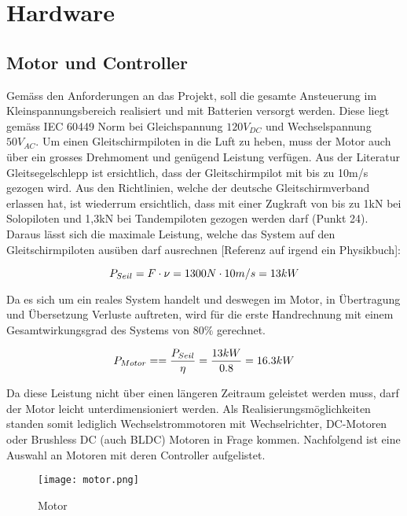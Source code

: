 \section{Hardware}

\subsection{Motor und Controller}\label{subsec:MotorController}
Gemäss den Anforderungen an das Projekt, soll die gesamte Ansteuerung im Kleinspannungsbereich realisiert und mit Batterien versorgt werden. Diese liegt gemäss IEC 60449 Norm bei Gleichspannung $120V_{DC}$ und Wechselspannung $50V_{AC}$. Um einen Gleitschirmpiloten in die Luft zu heben, muss der Motor auch über ein grosses Drehmoment und genügend Leistung verfügen. Aus der Literatur Gleitsegelschlepp \cite{Gleitsegelschlepp} ist ersichtlich, dass der Gleitschirmpilot mit bis zu 10m/s gezogen wird. Aus den Richtlinien, welche der deutsche Gleitschirmverband erlassen hat, ist wiederrum ersichtlich, dass mit einer Zugkraft von bis zu 1kN bei Solopiloten und 1,3kN bei Tandempiloten gezogen werden darf \cite{WindenProtokoll} (Punkt 24). Daraus lässt sich die maximale Leistung, welche das System auf den Gleitschirmpiloten ausüben darf ausrechnen [Referenz auf irgend ein Physikbuch]:


\begin{equation}
\centering
P_{Seil}=F \cdot \nu=1300N \cdot 10m/s=13kW
\label{eq:LeistungSeil}
\end{equation}

Da es sich um ein reales System handelt und deswegen im Motor, in Übertragung und Übersetzung Verluste auftreten, wird für die erste Handrechnung mit einem Gesamtwirkungsgrad des Systems von 80$\%$ gerechnet.

\begin{equation}
\centering
P_{Motor}==\frac{P_{Seil}}{\eta}=\frac{13kW}{0.8}=16.3kW
\label{eq:LeistungMotor}
\end{equation}

Da diese Leistung nicht über einen längeren Zeitraum geleistet werden muss, darf der Motor leicht unterdimensioniert werden. Als Realisierungsmöglichkeiten standen somit lediglich Wechselstrommotoren mit Wechselrichter, DC-Motoren oder Brushless DC (auch BLDC) Motoren in Frage kommen. Nachfolgend ist eine Auswahl an Motoren mit deren Controller aufgelistet.

\begin{figure}[H]
	\begin{center}
		\texttt{[image: motor.png]}
		\caption[Motorenvergleich]{Motor} %
		\label{fig:Motorenvergleich}
	\end{center}
\end{figure}

